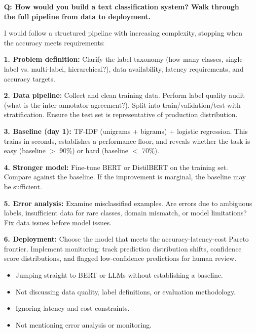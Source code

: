 \begin{interviewq}
\textbf{Q: How would you build a text classification system? Walk through the full pipeline
from data to deployment.}

 \quad {} \quad \badgefreq{\freqhigh}

\stronganswer
I would follow a structured pipeline with increasing complexity, stopping when the accuracy
meets requirements:

\textbf{1. Problem definition:} Clarify the label taxonomy (how many classes, single-label vs.
multi-label, hierarchical?), data availability, latency requirements, and accuracy targets.

\textbf{2. Data pipeline:} Collect and clean training data.  Perform label quality audit (what
is the inter-annotator agreement?).  Split into train/validation/test with stratification.
Ensure the test set is representative of production distribution.

\textbf{3. Baseline (day 1):} TF-IDF (unigrams + bigrams) + logistic regression.  This
trains in seconds, establishes a performance floor, and reveals whether the task is easy
(baseline $>$ 90\%) or hard (baseline $<$ 70\%).

\textbf{4. Stronger model:} Fine-tune BERT or DistilBERT on the training set.  Compare
against the baseline.  If the improvement is marginal, the baseline may be sufficient.

\textbf{5. Error analysis:} Examine misclassified examples.  Are errors due to ambiguous
labels, insufficient data for rare classes, domain mismatch, or model limitations?  Fix data
issues before model issues.

\textbf{6. Deployment:} Choose the model that meets the accuracy-latency-cost Pareto
frontier.  Implement monitoring: track prediction distribution shifts, confidence score
distributions, and flagged low-confidence predictions for human review.

\redflags
\begin{itemize}
    \item Jumping straight to BERT or LLMs without establishing a baseline.
    \item Not discussing data quality, label definitions, or evaluation methodology.
    \item Ignoring latency and cost constraints.
    \item Not mentioning error analysis or monitoring.
\end{itemize}


\end{interviewq}
